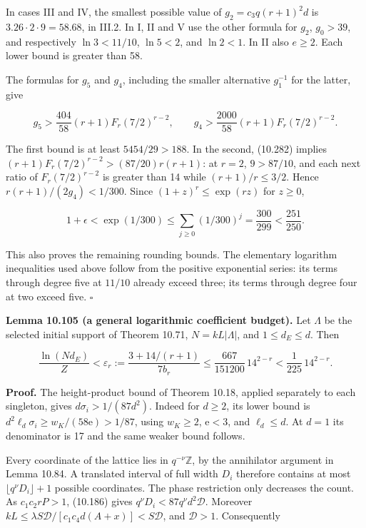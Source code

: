 \documentclass[
  11pt,
  a4paper,
]{article}
\begin{document}
In cases III and IV, the smallest possible value of \(g_2=c_3q(r+1)^2d\)
is \(3.26\cdot2\cdot9=58.68\), in III.2. In I, II and V use the other
formula for \(g_2\), \(g_0>39\), and respectively \(\ln3<11/10\),
\(\ln5<2\), and \(\ln2<1\). In II also \(e\ge2\). Each lower bound is
greater than 58.

The formulas for \(g_5\) and \(g_4\), including the smaller alternative
\(g_1^{-1}\) for the latter, give

\[
g_5>\frac{404}{58}(r+1)F_r(7/2)^{r-2},\qquad
g_4>\frac{2000}{58}(r+1)F_r(7/2)^{r-2}.
\tag{10.284}
\]

The first bound is at least \(5454/29>188\). In the second, (10.282)
implies \((r+1)F_r(7/2)^{r-2}> (87/20)r(r+1)\): at \(r=2\), \(9>87/10\),
and each next ratio of \(F_r(7/2)^{r-2}\) is greater than 14 while
\((r+1)/r\le3/2\). Hence \(r(r+1)/(2g_4)<1/300\). Since
\((1+z)^r\le\exp(rz)\) for \(z\ge0\),

\[
1+\epsilon<\exp(1/300)
\le\sum_{j\ge0}(1/300)^j
=\frac{300}{299}<\frac{251}{250}.
\]

This also proves the remaining rounding bounds. The elementary logarithm
inequalities used above follow from the positive exponential series: its
terms through degree five at \(11/10\) already exceed three; its terms
through degree four at two exceed five. \(\square\)

\textbf{Lemma 10.105 (a general logarithmic coefficient budget).} Let
\(\Lambda\) be the selected initial support of Theorem 10.71,
\(N=kL|\Lambda|\), and \(1\le d_E\le d\). Then

\[
\frac{\ln(Nd_E)}Z
<\varepsilon_r:=\frac{3+14/(r+1)}{7b_r}
\le\frac{667}{151200}\,14^{2-r}
<\frac1{225}\,14^{2-r}.
\tag{10.285}
\]

\textbf{Proof.} The height-product bound of Theorem 10.18, applied
separately to each singleton, gives \(d\sigma_i>1/(87d^2)\). Indeed for
\(d\ge2\), its lower bound is
\(d^2\ell_d\sigma_i\ge w_K/(58\mathrm e)>1/87\), using \(w_K\ge2\),
\(\mathrm e<3\), and \(\ell_d\le d\). At \(d=1\) its denominator is 17
and the same weaker bound follows.

Every coordinate of the lattice lies in \(q^{-\nu}\mathbb Z\), by the
annihilator argument in Lemma 10.84. A translated interval of full width
\(D_i\) therefore contains at most \(\lfloor q^\nu D_i\rfloor+1\)
possible coordinates. The phase restriction only decreases the count. As
\(c_1c_2rP>1\), (10.186) gives \(q^\nu D_i<87q^\nu d^2\mathcal D\).
Moreover \(kL\le\lambda S\mathcal D/[c_1c_4d(A+x)]<S\mathcal D\), and
\(\mathcal D>1\). Consequently
\end{document}
